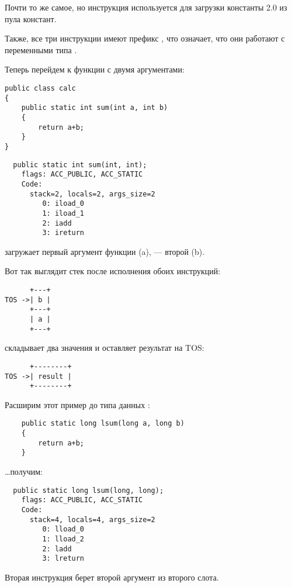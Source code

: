 Почти то же самое, но инструкция  используется для загрузки константы 
2.0 из пула констант.

Также, все три инструкции имеют префикс , что означает, что они работают с переменными
типа .


Теперь перейдем к функции с двумя аргументами:

\begin{lstlisting}
public class calc
{
	public static int sum(int a, int b)
	{
		return a+b;
	}
}
\end{lstlisting}

\begin{lstlisting}
  public static int sum(int, int);
    flags: ACC_PUBLIC, ACC_STATIC
    Code:
      stack=2, locals=2, args_size=2
         0: iload_0       
         1: iload_1       
         2: iadd          
         3: ireturn       
\end{lstlisting}


 загружает первый аргумент функции (a),  --- второй (b).

Вот так выглядит стек после исполнения обоих инструкций:

\begin{lstlisting}
      +---+
TOS ->| b |
      +---+
      | a |
      +---+
\end{lstlisting}


 складывает два значения и оставляет результат на \ac{TOS}:

\begin{lstlisting}
      +--------+
TOS ->| result |
      +--------+
\end{lstlisting}


Расширим этот пример до типа данных :

\begin{lstlisting}
	public static long lsum(long a, long b)
	{
		return a+b;
	}
\end{lstlisting}

\dots получим:

\begin{lstlisting}
  public static long lsum(long, long);
    flags: ACC_PUBLIC, ACC_STATIC
    Code:
      stack=4, locals=4, args_size=2
         0: lload_0       
         1: lload_2       
         2: ladd          
         3: lreturn       
\end{lstlisting}


Вторая инструкция  берет второй аргумент из второго слота.

